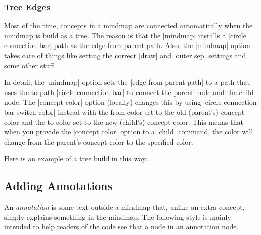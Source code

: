 \subsubsection{Tree Edges}

Most of the time, concepts in a mindmap are connected automatically
when the mindmap is build as a tree. The reason is that the |mindmap|
installs a |circle connection bar| path as the edge from parent
path. Also, the |mindmap| option takes care of things like setting the
correct |draw| and |outer sep| settings and some other stuff.

In detail, the |mindmap| option sets the |edge from parent path| to a
path that uses the to-path |circle connection bar| to connect the parent node
and the child node. The |concept color| option (locally) changes this
by using |circle connection bar switch color| instead with the
from-color set to the old (parent's) concept color and the to-color
set to the new (child's) concept color. This menas that when you
provide the |concept color| option to a |child| command, the color
will change from the parent's concept color to the specified color.

Here is an example of a tree build in this way:

\begin{codeexample}[]
\end{codeexample}



\subsection{Adding Annotations}

An \emph{annotation} is some text outside a mindmap that, unlike an
extra concept, simply explains something in the mindmap. The following
style is mainly intended to help readers of the code see that a node
in an annotation node.

